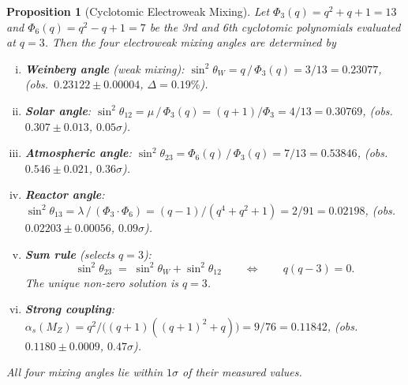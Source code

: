 \documentclass[12pt,a4paper]{article}
\newtheorem{proposition}[theorem]{Proposition}
\begin{document}
\begin{proposition}[Cyclotomic Electroweak Mixing]\label{prop:cyclotomic}
Let $\Phi_3(q) = q^2{+}q{+}1 = 13$ and $\Phi_6(q) = q^2{-}q{+}1 = 7$
be the 3rd and 6th cyclotomic polynomials evaluated at $q = 3$.
Then the four electroweak mixing angles are determined by
\begin{enumerate}[(i)]
  \item \textbf{Weinberg angle} (weak mixing):
        $\sin^2\theta_W = q\,/\,\Phi_3(q) = 3/13 = 0.23077$,
        \quad (obs.\ $0.23122 \pm 0.00004$, $\Delta = 0.19\%$).
  \item \textbf{Solar angle}:
        $\sin^2\theta_{12} = \mu\,/\,\Phi_3(q)
        = (q{+}1)/\Phi_3 = 4/13 = 0.30769$,
        \quad (obs.\ $0.307 \pm 0.013$, $0.05\sigma$).
  \item \textbf{Atmospheric angle}:
        $\sin^2\theta_{23} = \Phi_6(q)\,/\,\Phi_3(q)
        = 7/13 = 0.53846$,
        \quad (obs.\ $0.546 \pm 0.021$, $0.36\sigma$).
  \item \textbf{Reactor angle}:
        $\sin^2\theta_{13} = \lambda\,/\,(\Phi_3 \cdot \Phi_6)
        = (q{-}1)/(q^4{+}q^2{+}1) = 2/91 = 0.02198$,
        \quad (obs.\ $0.02203 \pm 0.00056$, $0.09\sigma$).
  \item \textbf{Sum rule} (selects $q = 3$):
        \[
          \sin^2\theta_{23}
          \;=\; \sin^2\theta_W + \sin^2\theta_{12}
          \qquad\Longleftrightarrow\qquad q(q{-}3) = 0.
        \]
        The unique non-zero solution is $q = 3$.
  \item \textbf{Strong coupling}:
        $\alpha_s(M_Z) = q^2\big/\bigl((q{+}1)((q{+}1)^2{+}q)\bigr)
        = 9/76 = 0.11842$,
        \quad (obs.\ $0.1180 \pm 0.0009$, $0.47\sigma$).
\end{enumerate}
All four mixing angles lie within $1\sigma$ of their measured values.
\end{proposition}
\end{document}
